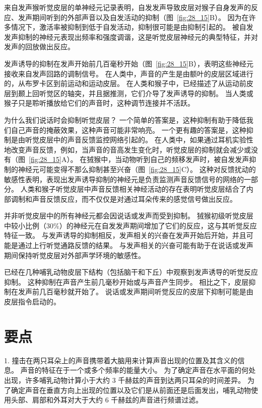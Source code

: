来自发声猴听觉皮层的单神经元记录表明，自发发声导致皮层对猴子自身发声的反应、发声期间听到的外部声音以及自发活动的抑制（图~\ref{fig:28_15}B）。
因为在许多情况下，激活率被抑制到低于自发活动，抑制很可能是由抑制引起的。
被自发发声抑制的神经元表现出频率和强度调谐，这是听觉皮层神经元的典型特征，并对发声的回放做出反应。


发声诱导的抑制在发声开始前几百毫秒开始（图~\ref{fig:28_15}B），表明这些神经元接收来自发声回路的调制信号。
在人类中，声音的产生是由额叶的皮层区域进行的，从布罗卡区到前运动和运动皮层。
在人类和猴子中，已经描述了从运动前皮层到颞上回听觉区的轴突，并且据推测，它们介导了发声诱导的抑制。
当人类或猴子只是聆听播放给它们的声音时，这种调节连接并不活跃。


为什么我们说话时会抑制听觉皮层？
一个简单的答案是，这种抑制有助于降低我们自己声音的掩蔽效果，这种声音可能非常响亮。
一个更有趣的答案是，这种抑制是由听觉皮层中的声音反馈监控网络引起的。
在人类中，如果通过耳机实验性地改变声音反馈，例如，当声音的音高发生变化时，听觉皮层的抑制就会减少或没有（图~\ref{fig:28_15}A）。
在狨猴中，当动物听到自己的频移发声时，被自发发声抑制的神经元可能变得不那么抑制甚至兴奋（图~\ref{fig:28_15}C）。
这种对反馈扰动的敏感性表明，表现出发声诱导抑制的神经元是负责监测声音反馈信号的网络的一部分。
人类和猴子听觉皮层中声音反馈相关神经活动的存在表明听觉皮层结合了内部调制和声音反馈反应，而不仅仅是对通过耳朵传来的感觉信号做出反应。


并非听觉皮层中的所有神经元都会因说话或发声而受到抑制。
狨猴初级听觉皮层中较小比例（30\%）的神经元在自发发声期间增加了它们的反应，这与其听觉反应特征一致。
与发声诱导的抑制相反，发声相关的兴奋在发声开始后开始，并且可能是通过上行听觉通路反馈的结果。
与发声相关的兴奋可能有助于在说话或发声期间保持听觉皮层对外部声学环境的敏感性。


已经在几种哺乳动物皮层下结构（包括脑干和下丘）中观察到发声诱导的听觉反应抑制。
这种抑制在声音产生前几毫秒开始或与声音产生同步。
相比之下，皮层抑制在发声前几百毫秒就开始了。
说话或发声期间听觉反应的皮层下抑制可能是由皮层指令启动的。



\section{要点}

1. 撞击在两只耳朵上的声音携带着大脑用来计算声音出现的位置及其含义的信息。
声音的特征在于一个或多个频率的能量大小。
为了确定声音在水平面的何处出现，许多哺乳动物计算小于大约 3 千赫兹的声音到达两只耳朵的时间差异。
为了确定声音在垂直方向上出现的位置以及它们是从前面还是后面发出，哺乳动物使用头部、肩部和外耳对大于大约 6 千赫兹的声音进行频谱过滤。 


